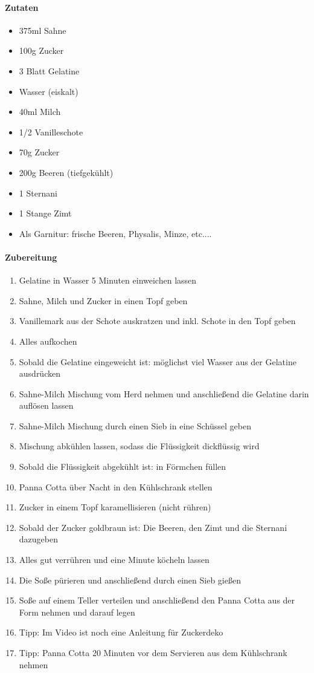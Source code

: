 \newpage
{}
\paragraph{Zutaten}
\begin{itemize}[noitemsep]
	\item 375ml Sahne
	\item 100g Zucker
	\item 3 Blatt Gelatine
	\item Wasser (eiskalt)
	\item 40ml Milch
	\item 1/2 Vanilleschote
	\vspace{0.5cm}
	\item 70g Zucker
	\item 200g Beeren (tiefgekühlt)
	\item 1 Sternani
	\item 1 Stange Zimt
	\item Als Garnitur: frische Beeren, Physalis, Minze, etc....
\end{itemize}
\paragraph{Zubereitung}
\begin{enumerate}[noitemsep]
	\item Gelatine in Wasser 5 Minuten einweichen lassen 
	\item Sahne, Milch und Zucker in einen Topf geben
	\item Vanillemark aus der Schote auskratzen und inkl. Schote in den Topf geben
	\item Alles aufkochen
	\item Sobald die Gelatine eingeweicht ist: möglichst viel Wasser aus der Gelatine ausdrücken
	\item Sahne-Milch Mischung vom Herd nehmen und anschließend die Gelatine darin auflösen lassen 
	\item Sahne-Milch Mischung durch einen Sieb in eine Schüssel geben 
	\item Mischung abkühlen lassen, sodass die Flüssigkeit dickflüssig wird
	\item Sobald die Flüssigkeit abgekühlt ist: in Förmchen füllen 
	\item Panna Cotta über Nacht in den Kühlschrank stellen
	\item Zucker in einem Topf karamellisieren (nicht rühren)
	\item Sobald der Zucker goldbraun ist: Die Beeren, den Zimt und die Sternani dazugeben
	\item Alles gut verrühren und eine Minute köcheln lassen
	\item Die Soße pürieren und anschließend durch einen Sieb gießen
	\item Soße auf einem Teller verteilen und anschließend den Panna Cotta aus der Form nehmen und darauf legen
	\item Tipp: Im Video ist noch eine Anleitung für Zuckerdeko
	\item Tipp: Panna Cotta 20 Minuten vor dem Servieren aus dem Kühlschrank nehmen
\end{enumerate}
